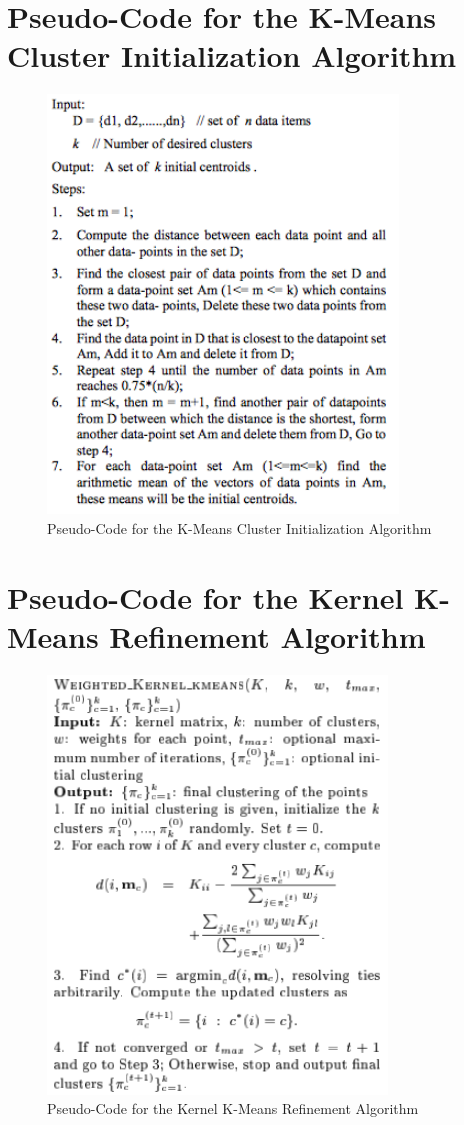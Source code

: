 \documentclass[12pt]{article}
\begin{document}
\newpage
\section{Pseudo-Code for the K-Means Cluster Initialization Algorithm}
\label{appendix:kmeansinit}
\begin{figure}[!htb]
\begin{center}
	\includegraphics[height=30em]{kmeans_init.png}
	\caption{Pseudo-Code for the K-Means Cluster Initialization Algorithm}
	\label{uml}
\end{center}
\end{figure}

\newpage
\section{Pseudo-Code for the Kernel K-Means Refinement Algorithm}
\label{appendix:kernel_kmeans}
\begin{figure}[!htb]
\begin{center}
	\includegraphics[height=30em]{kernel_kmeans.png}
	\caption{Pseudo-Code for the Kernel K-Means Refinement Algorithm}
	\label{uml}
\end{center}
\end{figure}
\end{document}
